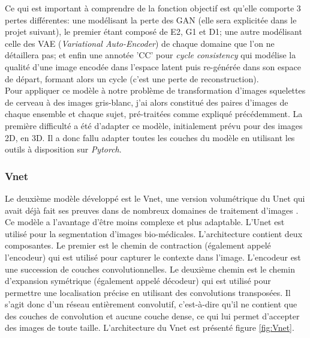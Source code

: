 \documentclass[12pt, oneside, a4paper, titlepage]{article}
\begin{document}
\vspace{5mm}

 Ce qui est important à comprendre de la fonction objectif est qu'elle comporte 3 pertes différentes: une modélisant la perte des GAN (elle sera explicitée dans le projet suivant), le premier étant composé de E2, G1 et D1; une autre modélisant celle des VAE (\textit{Variational Auto-Encoder}) de chaque domaine que l'on ne détaillera pas; et enfin une annotée 'CC' pour \textit{cycle consistency} qui modélise la qualité d'une image encodée dans l'espace latent puis re-générée dans son espace de départ, formant alors un cycle (c'est une perte de reconstruction).\\

Pour appliquer ce modèle à notre problème de transformation d'images squelettes de cerveau à des images gris-blanc, j'ai alors constitué des paires d'images de chaque ensemble et chaque sujet, pré-traitées comme expliqué précédemment. La première difficulté a été d'adapter ce modèle, initialement prévu pour des images 2D, en 3D. Il a donc fallu adapter toutes les couches du modèle en utilisant les outils à disposition sur \textit{Pytorch}.

\subsubsection{Vnet}
Le deuxième modèle développé est le Vnet, une version volumétrique du Unet qui avait déjà fait ses preuves dans de nombreux domaines de traitement d'images \cite{milletari_v-net_2016}. Ce modèle a l'avantage d'être moins complexe et plus adaptable. L'Unet \cite{ronneberger_u-net_2015} est utilisé pour la segmentation d'images bio-médicales. L'architecture contient deux composantes. Le premier est le chemin de contraction (également appelé l'encodeur) qui est utilisé pour capturer le contexte dans l'image. L'encodeur est une succession de couches convolutionnelles. Le deuxième chemin est le chemin d'expansion symétrique (également appelé décodeur) qui est utilisé pour permettre une localisation précise en utilisant des convolutions transposées. Il s'agit donc d'un réseau entièrement convolutif, c'est-à-dire qu'il ne contient que des couches de convolution et aucune couche dense, ce qui lui permet d'accepter des images de toute taille. L'architecture du Vnet est présenté figure \ref{fig:Vnet}.
\end{document}
